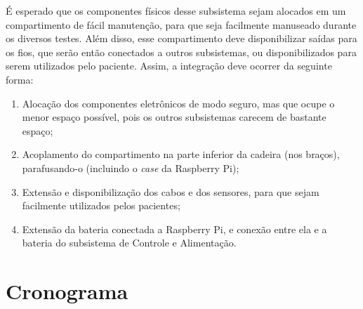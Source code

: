 É esperado que os componentes físicos desse subsistema sejam alocados em um
compartimento de fácil manutenção, para que seja facilmente manuseado durante
os diversos testes. Além disso, esse compartimento deve disponibilizar saídas
para os fios, que serão então conectados a outros subsistemas, ou
disponibilizados para serem utilizados pelo paciente. Assim, a integração deve
ocorrer da seguinte forma:

\begin{enumerate}
    \item Alocação dos componentes eletrônicos de modo seguro, mas que ocupe
        o menor espaço possível, pois os outros subsistemas carecem de bastante
        espaço;
    \item Acoplamento do compartimento na parte inferior da cadeira (nos braços),
        parafusando-o (incluindo o \textit{case} da Raspberry Pi);
    \item Extensão e disponibilização dos cabos e dos sensores, para que sejam
        facilmente utilizados pelos pacientes;
    \item Extensão da bateria conectada a Raspberry Pi, e conexão entre ela e a
        bateria do subsistema de Controle e Alimentação.
\end{enumerate}

\section{Cronograma}

\begin{table}[!htbp]
    \centering
    \caption{Cronograma para a integração dos subsistemas.}
    \label{tab:cronogramaintegracao}
\end{table}
